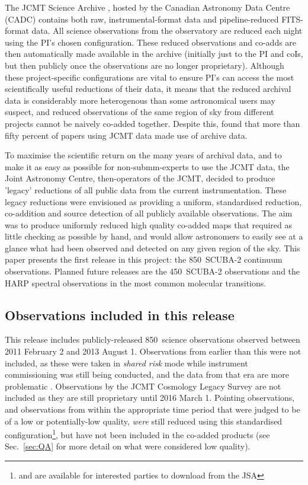 \documentclass[usenatbib]{mn2e}
\newcommand{\um}{\micron}
\newcommand{\sref}[1]{Sec.~\ref{#1}}
\begin{document}
The JCMT Science Archive \citep{2015Economou}, hosted by the Canadian
Astronomy Data Centre (CADC) contains both raw, instrumental-format
data and pipeline-reduced FITS-format data. All science observations
from the observatory are reduced each night using the PI's chosen
configuration.  These reduced observations and co-adds are then
automatically made available in the archive (initially just to the PI
and coIs, but then publicly once the observations are no longer
proprietary). Although these project-specific configurations are vital
to ensure PI's can access the most scientifically useful reductions of
their data, it means that the reduced archival data is considerably
more heterogenous than some astronomical users may suspect, and
reduced observations of the same region of sky from different projects
cannot be naively co-added together. Despite this,
\citet{Bell2014} found that more than fifty percent of
papers using JCMT data made use of archive data.

To maximise the scientific return on the many years of archival data,
and to make it as easy as possible for non-submm-experts to use the
JCMT data, the Joint Astronomy Centre, then-operators of the JCMT,
decided to produce 'legacy' reductions of all public data from the
current instrumentation. These legacy reductions were envisioned as
providing a uniform, standardised reduction, co-addition and source
detection of all publicly available observations. The aim was to
produce uniformly reduced high quality co-added maps that required as
little checking as possible by hand, and would allow astronomers to
easily see at a glance what had been observed and detected on any
given region of the sky. This paper presents the first release in this
project: the 850\um\ SCUBA-2 continuum observations. Planned future
releases are the 450\um\ SCUBA-2 observations and the HARP spectral
observations in the most common molecular transitions.



\subsection{Observations included in this release}

This release includes publicly-released 850\um\ science observations
observed between 2011 February 2 and 2013 August 1. Observations from
earlier than this were not included, as these were taken in
\emph{shared risk} mode while instrument commissioning was still being
conducted, and the data from that era are more problematic
\citep{SC19,Dempsey2010}.  Observations by the JCMT Cosmology Legacy
Survey \citep{Geach2013} are not included as they are still
proprietary until 2016 March 1. Pointing observations, and
observations from within the appropriate time period that were judged
to be of a low or potentially-low quality, \emph{were} still reduced
using this standardised configuration\footnote{and are available for
  interested parties to download from the JSA}, but have not been
included in the co-added products (see \sref{sec:QA} for more detail
on what were considered low quality).
\end{document}
